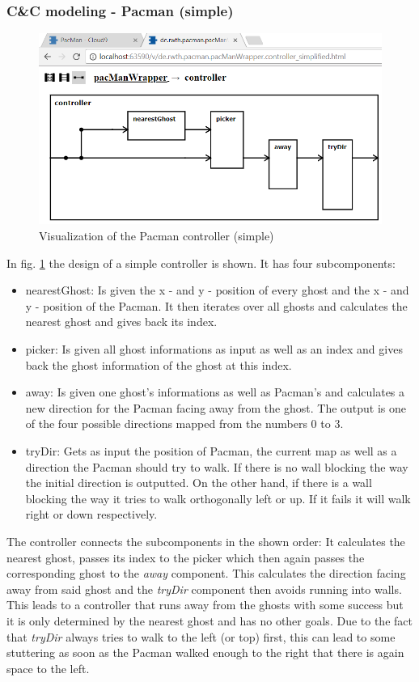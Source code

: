 \subsubsection{C\&C modeling - Pacman (simple)}
\begin{figure}
	\label{fig:visPacmanSimple}
	\centering
	\includegraphics[scale=0.7]{pictures/VisualizationPacmanSimple.png}
	\caption{Visualization of the Pacman controller (simple)}
\end{figure}
In fig. \ref{fig:visPacmanSimple} the design of a simple controller is shown. It has four subcomponents:
\begin{itemize}
	\item nearestGhost: Is given the x - and y - position of every ghost and the x - and y - position of the Pacman. It then iterates over all ghosts and calculates the nearest ghost and gives back its index.
	\item picker: Is given all ghost informations as input as well as an index and gives back the ghost information of the ghost at this index.
	\item away: Is given one ghost's informations as well as Pacman's and calculates a new direction for the Pacman facing away from the ghost. The output is one of the four possible directions mapped from the numbers 0 to 3.
	\item tryDir: Gets as input the position of Pacman, the current map as well as a direction the Pacman should try to walk. If there is no wall blocking the way the initial direction is outputted. On the other hand, if there is a wall blocking the way it tries to walk orthogonally left or up. If it fails it will walk right or down respectively.
\end{itemize}
The controller connects the subcomponents in the shown order: It calculates the nearest ghost, passes its index to the picker which then again passes the corresponding ghost to the \textit{away} component. This calculates the direction facing away from said ghost and the \textit{tryDir} component then avoids running into walls. This leads to a controller that runs away from the ghosts with some success but it is only determined by the nearest ghost and has no other goals. Due to the fact that \textit{tryDir} always tries to walk to the left (or top) first, this can lead to some stuttering as soon as the Pacman walked enough to the right that there is again space to the left. \newline
